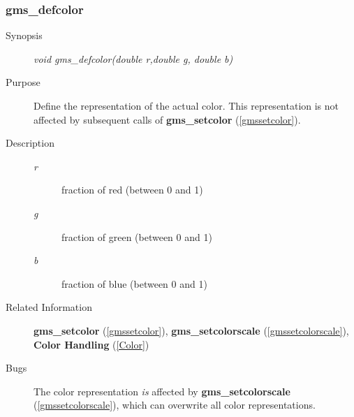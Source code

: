 \newpage



\subsubsection{gms\_defcolor\label{gmsdefcolor}}
\begin{description}
\item[Synopsis]\mbox{}


{\em void    gms\_defcolor(double r,double g, double b)\/}
\item[Purpose]\mbox{}


Define the representation of the actual color.
This representation is not affected by subsequent calls of
{\bf gms\_setcolor} (\ref{gmssetcolor}).
\item[Description]\mbox{}


\begin{description}
\item[{\em r\/}]\mbox{}

 fraction of red (between 0 and 1) 
\item[{\em g\/}]\mbox{}

 fraction of green (between 0 and 1) 
\item[{\em b\/}]\mbox{}

 fraction of blue (between 0 and 1) 
\end{description}

\item[Related Information]\mbox{}


{\bf gms\_setcolor} (\ref{gmssetcolor}), 
{\bf gms\_setcolorscale} (\ref{gmssetcolorscale}),
{\bf Color Handling} (\ref{Color})
\item[Bugs]\mbox{}


The color representation  {\em is\/} affected by  
{\bf gms\_setcolorscale} (\ref{gmssetcolorscale}),
which can overwrite all color representations. 
\end{description}



\newpage



